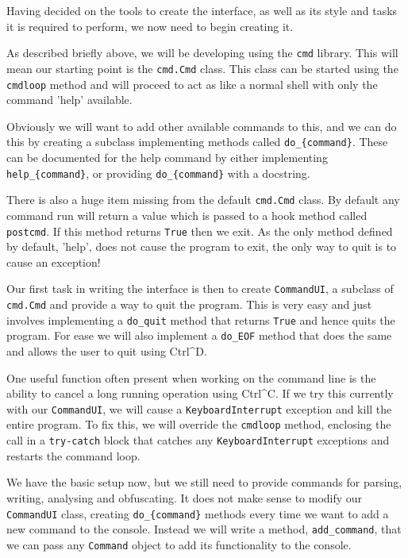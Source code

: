 \documentclass{report}
\begin{document}
Having decided on the tools to create the interface, as well as its style and tasks it is required to perform, we now need to begin creating it.

As described briefly above, we will be developing using the \texttt{cmd} library. This will mean our starting point is the \texttt{cmd.Cmd} class.
This class can be started using the \texttt{cmdloop} method and will proceed to act as like a normal shell with only the command 'help' available.

Obviously we will want to add other available commands to this, and we can do this by creating a subclass implementing methods called
\texttt{do\_\{command\}}. These can be documented for the help command by either implementing \texttt{help\_\{command\}}, or providing
\texttt{do\_\{command\}} with a docstring.

There is also a huge item missing from the default \texttt{cmd.Cmd} class. By default any command run will return a value which is passed to a
hook method called \texttt{postcmd}. If this method returns \texttt{True} then we exit. As the only method defined by default, 'help', does not
cause the program to exit, the only way to quit is to cause an exception!

Our first task in writing the interface is then to create \texttt{CommandUI}, a subclass of \texttt{cmd.Cmd} and provide a way to quit the program.
This is very easy and just involves implementing a \texttt{do\_quit} method that returns \texttt{True} and hence quits the program. For ease we will
also implement a \texttt{do\_EOF} method that does the same and allows the user to quit using Ctrl\^{}D.

One useful function often present when working on the command line is the ability to cancel a long running operation using Ctrl\^{}C. If we try this
currently with our \texttt{CommandUI}, we will cause a \texttt{KeyboardInterrupt} exception and kill the entire program. To fix this, we will
override the \texttt{cmdloop} method, enclosing the call in a \texttt{try-catch} block that catches any \texttt{KeyboardInterrupt} exceptions and
restarts the command loop.

We have the basic setup now, but we still need to provide commands for parsing, writing, analysing and obfuscating. It does not make sense to modify
our \texttt{CommandUI} class, creating \texttt{do\_\{command\}} methods every time we want to add a new command to the console. Instead we will write
a method, \texttt{add\_command}, that we can pass any \texttt{Command} object to add its functionality to the console.
\end{document}
